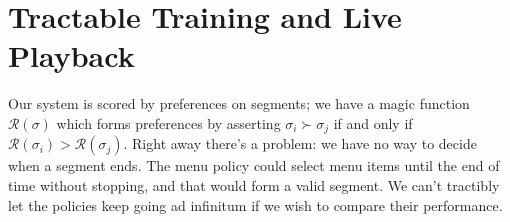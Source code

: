 \section{Tractable Training and Live Playback}

Our system is scored by preferences on segments; we have a magic function $ \mathcal{R}(\sigma) $ which forms preferences by asserting $ \sigma_i \succ \sigma_j $ if and only if $ \mathcal{R}(\sigma_i) > \mathcal{R}(\sigma_j) $.
Right away there's a problem: we have no way to decide when a segment ends.
The menu policy could select menu items until the end of time without stopping, and that would form a valid segment.
We can't tractibly let the policies keep going ad infinitum if we wish to compare their performance.


